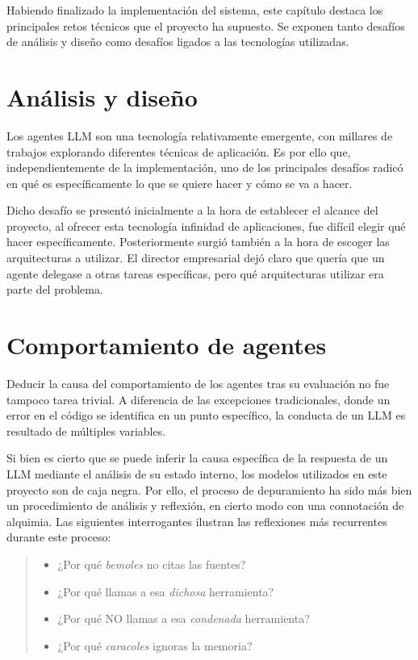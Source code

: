 Habiendo finalizado la implementación del sistema, este capítulo destaca los principales retos técnicos que el proyecto ha supuesto. Se exponen tanto desafíos de análisis y diseño como desafíos ligados a las tecnologías utilizadas. 

\section{Análisis y diseño}
Los agentes LLM son una tecnología relativamente emergente, con millares de trabajos explorando diferentes técnicas de aplicación. Es por ello que, independientemente de la implementación, uno de los principales desafíos radicó en qué es específicamente lo que se quiere hacer y cómo se va a hacer.

Dicho desafío se presentó inicialmente a la hora de establecer el alcance del proyecto, al ofrecer esta tecnología infinidad de aplicaciones, fue difícil elegir qué hacer específicamente. Posteriormente surgió también a la hora de escoger las arquitecturas a utilizar. El director empresarial dejó claro que quería que un agente delegase a otras tareas específicas, pero qué arquitecturas utilizar era parte del problema. 

\section{Comportamiento de agentes}
Deducir la causa del comportamiento de los agentes tras su evaluación no fue tampoco tarea trivial. A diferencia de las excepciones tradicionales, donde un error en el código se identifica en un punto específico, la conducta de un LLM es resultado de múltiples variables. 

Si bien es cierto que se puede inferir la causa específica de la respuesta de un LLM mediante el análisis de su estado interno, los modelos utilizados en este proyecto son de caja negra. Por ello, el proceso de depuramiento ha sido más bien un procedimiento de análisis y reflexión, en cierto modo con una connotación de alquimia. Las siguientes interrogantes ilustran las reflexiones más recurrentes durante este proceso:

\begin{quote}
\begin{itemize}
    \item ¿Por qué \textit{bemoles} no citas las fuentes? 
    \item ¿Por qué llamas a esa \textit{dichosa} herramienta?
    \item ¿Por qué NO llamas a esa \textit{condenada} herramienta?
    \item ¿Por qué \textit{caracoles} ignoras la memoria?
\end{itemize}
\end{quote}


